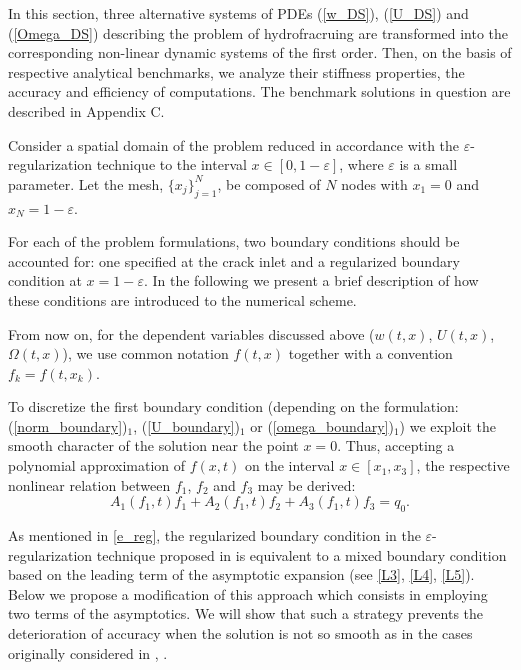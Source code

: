 In this section, three alternative systems of PDEs (\ref{w_DS}), (\ref{U_DS}) and (\ref{Omega_DS}) describing
the problem of hydrofracruing are transformed into the corresponding
non-linear dynamic systems of the first order. Then, on the basis of
respective analytical benchmarks, we analyze their stiffness
properties, the accuracy and efficiency of computations. The
benchmark solutions in question are described in Appendix C.

Consider a spatial domain of the problem reduced in accordance with
the $\varepsilon$-regularization technique to the interval $x
\in[0,1-\varepsilon]$, where $\varepsilon$ is a small parameter. Let
the mesh, $\{x_j\}_{j=1}^{N}$, be composed of $N $ nodes with
$x_1=0$ and $x_N=1-\varepsilon$.



For each of the problem formulations, two boundary conditions should
be accounted for: one specified at the crack inlet and a regularized
boundary condition at $x=1-\varepsilon$. In the following we present
a brief description of how these conditions are introduced to the
numerical scheme.

From now on, for the dependent variables discussed above ($w(t,x)$, $U(t,x)$, $\Omega(t,x)$),
we use common notation $f(t,x)$ together with a convention
$f_k=f(t,x_k)$.


To discretize the first boundary condition (depending on the
formulation: (\ref{norm_boundary})$_1$, (\ref{U_boundary})$_1$ or
(\ref{omega_boundary})$_1$) we exploit the smooth character of the
solution near the point $x=0$. Thus, accepting a polynomial
approximation of $f(x,t)$ on the interval $x \in [x_1,x_3]$, the
respective nonlinear relation between $f_1$, $f_2$ and $f_3$ may be
derived:
\begin{equation}
\label{BC_0} A_1(f_1,t)f_1+A_2(f_1,t)f_2+A_3(f_1,t)f_3=q_0.
\end{equation}



As mentioned in \ref{e_reg}, the regularized boundary condition in
the $\varepsilon$-regularization technique proposed in
\cite{Linkov_1} is equivalent to a mixed boundary condition based on
the leading term of the asymptotic expansion (see \eqref{L3},
\eqref{L4}, \eqref{L5}). Below we propose a modification of this
approach which consists in employing two terms of the asymptotics.
We will show that such a strategy prevents the  deterioration of accuracy
when the solution is not so smooth as in the cases originally
considered in \cite{Linkov_1}, \cite{MWL}.

